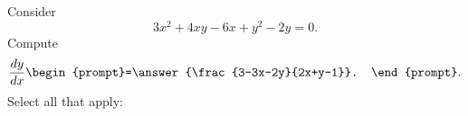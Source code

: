 \documentclass{ximera}
\author{Steven Gubkin}
\begin{document}
\begin{exercise}

Consider
\[
3x^2+4xy-6x+y^2-2y=0.
\]
Compute
\[
\frac{dy}{dx} \begin{prompt}=\answer{\frac{3-3x-2y}{2x+y-1}}.
\end{prompt}.
\]
Select all that apply:
\begin{selectAll}
\end{selectAll}

\end{exercise}
\end{document}
